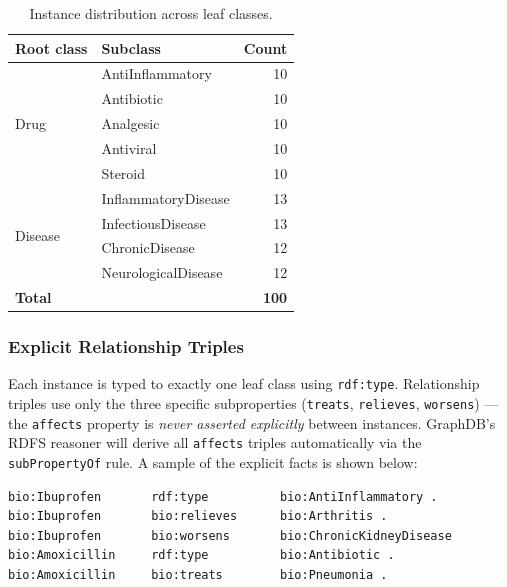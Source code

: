 \documentclass[11pt,a4paper]{article}
\begin{document}
\begin{table}[h!]
\centering
\caption{Instance distribution across leaf classes.}
\label{tab:instances}
\begin{tabular}{@{}llr@{}}
\toprule
\textbf{Root class} & \textbf{Subclass} & \textbf{Count} \\
\midrule
\multirow{5}{*}{Drug}    & AntiInflammatory & 10 \\
                         & Antibiotic       & 10 \\
                         & Analgesic        & 10 \\
                         & Antiviral        & 10 \\
                         & Steroid          & 10 \\
\midrule
\multirow{4}{*}{Disease} & InflammatoryDisease  & 13 \\
                         & InfectiousDisease    & 13 \\
                         & ChronicDisease       & 12 \\
                         & NeurologicalDisease  & 12 \\
\midrule
\multicolumn{2}{l}{\textbf{Total}} & \textbf{100} \\
\bottomrule
\end{tabular}
\end{table}

\subsubsection*{Explicit Relationship Triples}

Each instance is typed to exactly one leaf class using \texttt{rdf:type}.
Relationship triples use only the three specific subproperties (\texttt{treats},
\texttt{relieves}, \texttt{worsens}) — the \texttt{affects} property is
\emph{never asserted explicitly} between instances.  GraphDB's RDFS reasoner
will derive all \texttt{affects} triples automatically via the
\texttt{subPropertyOf} rule.  A sample of the explicit facts is shown below:

\begin{lstlisting}[style=turtle, caption={Sample Turtle triples from the facts layer.}]
bio:Ibuprofen       rdf:type          bio:AntiInflammatory .
bio:Ibuprofen       bio:relieves      bio:Arthritis .
bio:Ibuprofen       bio:worsens       bio:ChronicKidneyDisease 
bio:Amoxicillin     rdf:type          bio:Antibiotic .
bio:Amoxicillin     bio:treats        bio:Pneumonia .
\end{lstlisting}
\end{document}
